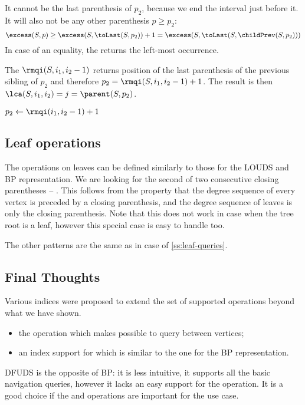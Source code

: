 It cannot be the last parenthesis of $p_2$, because we end the interval just before it.
It will also not be any other parenthesis $p \ge p_2$:
$$\excess(S, p) \ge \excess(S, \toLast(S, p_2)) + 1 = \excess(S, \toLast(S, \childPrev(S, p_2)))$$
In case of an equality, the \rmqi returns the left-most occurrence.

The $\rmqi(S, i_1, i_2 - 1)$ returns position of the last parenthesis of the previous sibling of $p_2$ and therefore $p_2 = \rmqi(S, i_1, i_2 - 1) + 1$.
The result is then $\lca(S, i_1, i_2) = j = \parent(S, p_2)$.

\begin{algorithmic}
		\State {}
		\State {}
	\Else
		\State $p_2 \gets \rmqi(i_1, i_2 - 1) + 1$
		\State {}
	\EndIf
\EndFunction
\end{algorithmic}

\subsection{Leaf operations}

The operations on leaves can be defined similarly to those for the LOUDS and BP representation.
We are looking for the second of two consecutive closing parentheses -- \str{))}.
This follows from the property that the degree sequence of every vertex is preceded by a closing parenthesis, and the degree sequence of leaves is only the closing parenthesis.
Note that this does not work in case when the tree root is a leaf, however this special case is easy to handle too.

The other patterns are the same as in case of \ref{ss:leaf-queries}.

\subsection{Final Thoughts}

Various indices were proposed to extend the set of supported operations beyond what we have shown.
\begin{itemize}
	\item the operation \dep{} which makes possible to query \distance{} between vertices;
	\item an index support for \levelAncestor{} which is similar to the one for the BP representation.
\end{itemize}

DFUDS is the opposite of BP: it is less intuitive, it supports all the basic navigation queries, however it lacks an easy support for the \dep{} operation.
It is a good choice if the \preRank{} and \childAny{} operations are important for the use case.